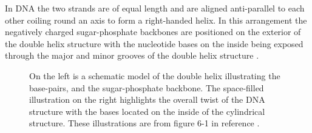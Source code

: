 In DNA the two strands are of equal length and are aligned anti-parallel to each other coiling round an axis to form a right-handed helix. In this arrangement the negatively charged sugar-phosphate backbones are positioned on the exterior of the double helix structure with the nucleotide bases on the inside being exposed through the major and minor grooves of the double helix structure . 
%
\begin{figure}[t]
\centering
{}                
\hspace{10mm}
\caption{On the left is a schematic model of the double helix illustrating the base-pairs, and the sugar-phosphate backbone. The space-filled illustration on the right highlights the overall twist of the DNA structure with the bases located on the inside of the cylindrical structure. These illustrations are from figure 6-1 in reference \cite{Watson2003}.} 
\label{fig:dna_structure_filled}
\end{figure}

